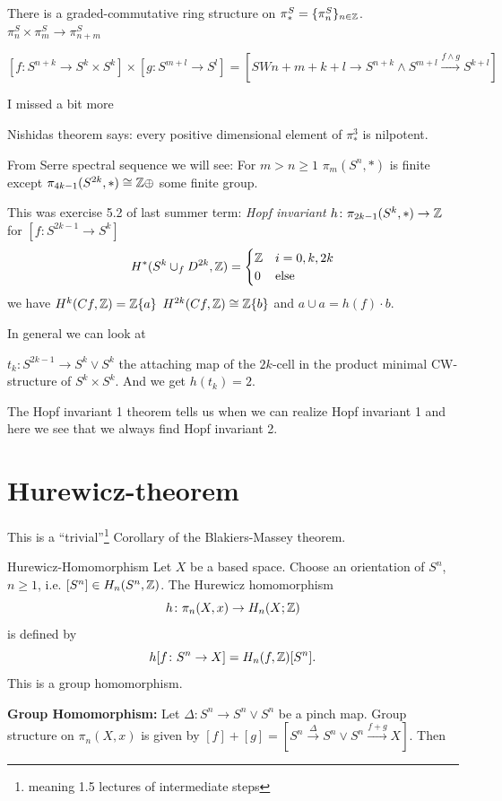 \documentclass[language=english]{TemplateLecture}
\begin{document}
There is a graded-commutative ring structure on \(\pi_*^S = \{\pi_n^S\}_{n \in \mathbb{Z}}\). \(\pi_n^S \times \pi_m^S \to \pi_{n+m}^S\)

\[[f\colon S^{n+k}\to S^k\times S^k] \times [g \colon S^{m+l}\to S^l] = [SW{n+m+k+l} \to S^{n+k} \wedge S^{m+l} \xrightarrow{f\wedge g} S^{k+l}]\]

I missed a bit more

Nishidas theorem says: every positive dimensional element of \(\pi_*^3\) is nilpotent.

From Serre spectral sequence we will see: For \(m > n\geq 1\) \(\pi_m(S^n, *)\) is finite except \(\pi_{4k - 1}(S^{2k}, *) \cong \mathbb{Z} \oplus \) some finite group.

This was exercise 5.2 of last summer term: \emph{Hopf invariant} \(h\colon \pi_{2k-1}(S^k, *) \to \mathbb{Z}\) for \([f\colon S^{2k-1}\to S^k]\)
\[H^*(S^k\cup_f D^{2k}, \mathbb{Z}) = \begin{cases}
    \mathbb{Z} & i = 0,k,2k \\
    0 & \text{else}
\end{cases}\]
we have 
\(H^k(Cf, \mathbb{Z}) = \mathbb{Z}\{a\}\) \(H^{2k}(Cf, \mathbb{Z}) \cong \mathbb{Z}\{b\}\) and \(a \cup a = h(f) \cdot b\).

In general we can look at

\(t_k\colon S^{2k-1}\to S^k\vee S^k\) the attaching map of the \(2k\)-cell in the product minimal CW-structure of \(S^k \times S^k\). And we get \(h(t_k) = 2\).

The Hopf invariant 1 theorem tells us when we can realize Hopf invariant 1 and here we see that we always find Hopf invariant 2.

\section{Hurewicz-theorem}

This is a \enquote{trivial}\footnote{meaning 1.5 lectures of intermediate steps} Corollary of the Blakiers-Massey theorem.

\begin{defi}{}{Hurewicz-Homomorphism}
    Let \(X\) be a based space. Choose an orientation of \(S^n\), \(n \geq 1\), i.e. \([S^n] \in H_n(S^n, \mathbb{Z})\). The Hurewicz homomorphism
    \[h\colon \pi_n(X,x) \to H_n(X;\mathbb{Z})\]
    is defined by
    \[h[f\colon S^n\to X] = H_n(f, \mathbb{Z})[S^n].\]
    This is a group homomorphism.
\end{defi}

\textbf{Group Homomorphism:} Let \(\Delta\colon S^n \to S^n \vee S^n\) be a pinch map.
Group structure on \(\pi_n(X,x)\) is given by \([f]+[g] = [S^n\xrightarrow{\Delta}S^n\vee S^n \xrightarrow{f+g} X]\). Then
\end{document}
